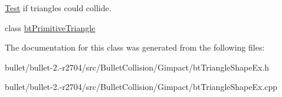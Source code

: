 \hyperlink{class_test}{Test} if triangles could collide. 

class \hyperlink{classbt_primitive_triangle}{bt\+Primitive\+Triangle} 

The documentation for this class was generated from the following files\+:\begin{DoxyCompactItemize}
\item 
bullet/bullet-\/2.-\/r2704/src/\+Bullet\+Collision/\+Gimpact/bt\+Triangle\+Shape\+Ex.\+h\item 
bullet/bullet-\/2.-\/r2704/src/\+Bullet\+Collision/\+Gimpact/bt\+Triangle\+Shape\+Ex.\+cpp\end{DoxyCompactItemize}
